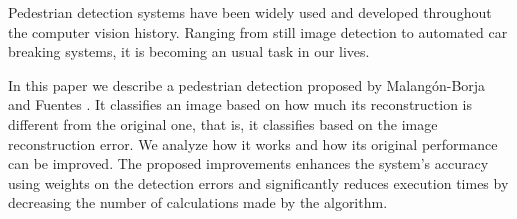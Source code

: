 \documentclass[10pt, conference, compsocconf]{IEEEtran}
\begin{document}


Pedestrian detection systems have been widely used and developed throughout the computer vision history. Ranging from still image detection to automated car breaking systems, it is becoming an usual task in our lives.

In this paper we describe a pedestrian detection proposed by Malang\'{o}n-Borja and Fuentes \cite{borja09}. It classifies an image based on how much its reconstruction is different from the original one, that is, it classifies based on the image reconstruction error. We analyze how it works and how its original performance can be improved. The proposed improvements enhances the system's accuracy using weights on the detection errors and significantly reduces execution times by decreasing the number of calculations made by the algorithm.

\end{document}
